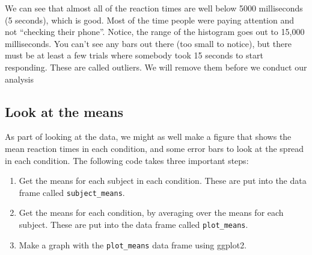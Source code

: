 \documentclass[]{book}
\providecommand{\tightlist}{%
  \setlength{\itemsep}{0pt}\setlength{\parskip}{0pt}}
\theoremstyle{definition}
\theoremstyle{definition}
\theoremstyle{definition}
\theoremstyle{remark}
\begin{document}
We can see that almost all of the reaction times are well below 5000
milliseconds (5 seconds), which is good. Most of the time people were
paying attention and not ``checking their phone''. Notice, the range of
the histogram goes out to 15,000 milliseconds. You can't see any bars
out there (too small to notice), but there must be at least a few trials
where somebody took 15 seconds to start responding. These are called
outliers. We will remove them before we conduct our analysis

\subsection{Look at the means}\label{look-at-the-means}

As part of looking at the data, we might as well make a figure that
shows the mean reaction times in each condition, and some error bars to
look at the spread in each condition. The following code takes three
important steps:

\begin{enumerate}
\def\labelenumi{\arabic{enumi}.}
\tightlist
\item
  Get the means for each subject in each condition. These are put into
  the data frame called \texttt{subject\_means}.
\item
  Get the means for each condition, by averaging over the means for each
  subject. These are put into the data frame called
  \texttt{plot\_means}.
\item
  Make a graph with the \texttt{plot\_means} data frame using ggplot2.
\end{enumerate}
\end{document}
